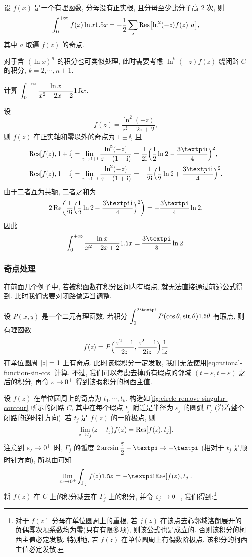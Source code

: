 \begin{theorem}
  \label{thm:integral-ln}
  设 $f(x)$ 是一个有理函数, 分母没有正实根, 且分母至少比分子高 $2$ 次, 则
  \[
    \displaystyle\int_0^{+\infty} f(x)\ln x1.5 x
    =-\frac12 \sum_a {\mathrm{Res}}\bigl[\ln^2(-z)f(z),a\bigr],
  \]
  其中 $a$ 取遍 $f(z)$ 的奇点.
\end{theorem}
对于含 $(\ln x)^n$ 的积分也可类似处理, 此时需要考虑 $\ln^k(-z)f(z)$ 绕闭路 $C$ 的积分, $k=2,\cdots,n+1$.

\begin{example}
  计算 $\displaystyle\int_0^{+\infty}\dfrac{\ln x}{x^2-2x+2}1.5 x$.
\end{example}

\begin{solution}
  设
  \[
    f(z)=\frac{\ln^2(-z)}{z^2-2z+2},
  \]
  则 $f(z)$ 在正实轴和零以外的奇点为 $1\pm\ii$,
  且
  \begin{align*}
     \Res[f(z),1+\ii]&
    =\lim_{z\ra 1+\ii}\frac{\ln^2(-z)}{z-(1-\ii)}
    =\frac1{2\ii}\Bigl(\frac12\ln2-\frac{3\cpi\ii}4\Bigr)^2,
    \\
     \Res[f(z),1-\ii]&
    =\lim_{z\ra 1-\ii}\frac{\ln^2(-z)}{z-(1+\ii)}
    =-\frac1{2\ii}\Bigl(\frac12\ln2+\frac{3\cpi\ii}4\Bigr)^2.
  \end{align*}
  由于二者互为共轭, 二者之和为 
  \[
    2\Re\biggl(\frac1{2\ii}\Bigl(\frac12\ln2-\frac{3\cpi\ii}4\Bigr)^2\biggr)
    =-\frac{3\cpi}4\ln2.
  \]
  因此
  \[
    \intf\dfrac{\ln x}{x^2-2x+2}\d x=\frac{3\cpi}8\ln2.
  \]
\end{solution}


\subsubsection{奇点处理\optional}
在前面几个例子中, 若被积函数在积分区间内有瑕点, 就无法直接通过前述公式得到.
此时我们需要对闭路做适当调整.

设 $P(x,y)$ 是一个二元有理函数.
若积分 $\dint_0^{2\cpi} P(\cos\theta,\sin\theta)\d\theta$ 有瑕点, 则有理函数
\[
  f(z)=P\Bigl(\frac{z^2+1}{2z},\frac{z^2-1}{2\mathrm{i} z}\Bigr)\frac1{\mathrm{i} z}
\]
在单位圆周 $\lvert z\rvert=1$ 上有奇点.
此时该瑕积分一定发散, 我们无法使用\eqref{eq:rational-function-sin-cos} 计算.
不过, 我们可以考虑去掉所有瑕点的邻域 $(t-\varepsilon,t+\varepsilon)$ 之后的积分, 再令 $\varepsilon\rightarrow 0^+$ 得到该瑕积分的柯西主值.

设 $f(z)$ 在单位圆周上的奇点为 $t_1,\cdots,t_k$.
构造如\ref{fig:circle-remove-singular-contour} 所示的闭路 $C$, 其中在每个瑕点 $t_j$ 附近是半径为 $\varepsilon_j$ 的圆弧 $\Gamma_j$ (沿着整个闭路的逆时针方向).
若 $t_j$ 是 $f(z)$ 的一阶极点, 则
\[
  \lim_{z\rightarrow t_j} (z-t_j)f(z)={\mathrm{Res}}[f(z),t_j].
\]
注意到 $\varepsilon_j\rightarrow 0^+$ 时, $\Gamma_j$ 的弧度 $2\arcsin\dfrac\varepsilon2-\cpi\ra -\cpi$ (相对于 $t_j$ 是顺时针方向), 所以由\thmsa 可知
\[
  \lim_{\varepsilon_j\ra 0^+}\int_{\Gamma_j}f(z)\d z
  =-\cpi\ii\Res[f(z),t_j].
\]
将 $f(z)$ 在 $C$ 上的积分减去在 $\Gamma_j$ 上的积分, 并令 $\varepsilon_j\rightarrow 0^+$, 我们得到:\footnote{
  对于 $f(z)$ 分母在单位圆周上的重根, 若 $f(z)$ 在该点去心邻域洛朗展开的负偶幂次项系数均为零(只有有限多项), 则该公式也是成立的.
  否则该积分的柯西主值必定发散.
  特别地, 若 $f(z)$ 在单位圆周上有偶数阶极点, 该积分的柯西主值必定发散.
}

